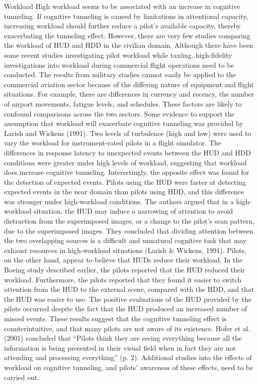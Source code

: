 \documentclass[utf8,bachelor,manualbib]{gradu3}
\begin{document}
Workload
High workload seems to be associated with an increase in cognitive tunneling. If
cognitive tunneling is caused by limitations in attentional capacity, increasing
workload should further reduce a pilot’s available capacity, thereby exacerbating
the tunneling effect. However, there are very few studies comparing the workload
of HUD and HDD in the civilian domain. Although there have been some
recent studies investigating pilot workload while taxiing, high-fidelity investigations
into workload during commercial flight operations need to be conducted.
The results from military studies cannot easily be applied to the commercial aviation
sector because of the differing nature of equipment and flight situations.
For example, there are differences in currency and recency, the number of airport
movements, fatigue levels, and schedules. These factors are likely to confound
comparisons across the two sectors.
Some evidence to support the assumption that workload will exacerbate cognitive
tunneling was provided by Larish and Wickens (1991). Two levels of turbulence
(high and low) were used to vary the workload for instrument-rated
pilots in a flight simulator. The differences in response latency to unexpected
events between the HUD and HDD conditions were greater under high levels of
workload, suggesting that workload does increase cognitive tunneling. Interestingly,
the opposite effect was found for the detection of expected events. Pilots
using the HUD were faster at detecting expected events in the near domain than
pilots using HDD, and this difference was stronger under high-workload conditions.
The authors argued that in a high-workload situation, the HUD may induce
a narrowing of attention to avoid distraction from the superimposed
images, or a change to the pilot’s scan pattern, due to the superimposed images.
They concluded that dividing attention between the two overlapping sources is a
difficult and unnatural cognitive task that may exhaust resources in
high-workload situations (Larish \& Wickens, 1991).
Pilots, on the other hand, appear to believe that HUDs reduce their workload.
In the Boeing study described earlier, the pilots reported that the HUD reduced
their workload. Furthermore, the pilots reported that they found it easier to
switch attention from the HUD to the external scene, compared with the HDD,
and that the HUD was easier to use. The positive evaluations of the HUD provided
by the pilots occurred despite the fact that the HUD produced an increased
number of missed events. These results suggest that the cognitive tunneling effect
is counterintuitive, and that many pilots are not aware of its existence. Hofer
et al. (2001) concluded that “Pilots think they are seeing everything because all
the information is being presented in their visual field when in fact they are not
attending and processing everything” (p. 2). Additional studies into the effects
of workload on cognitive tunneling, and pilots’ awareness of these effects, need
to be carried out. \citep{crawford2006}
\end{document}
